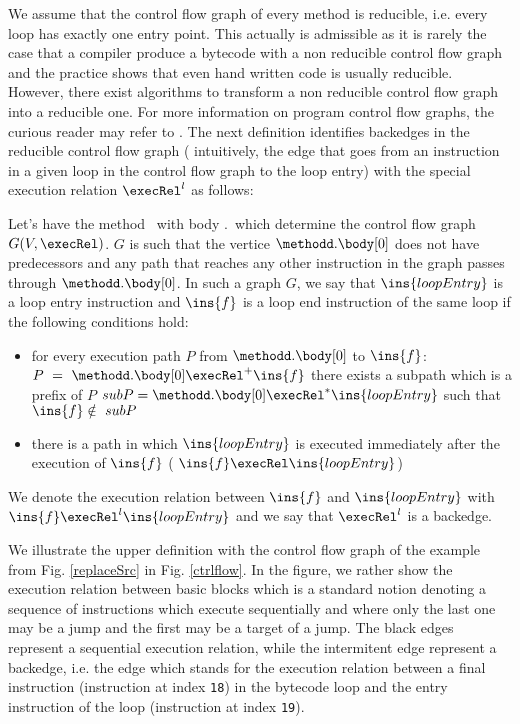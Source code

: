 We assume that the control flow graph of every method is reducible, i.e. every loop has exactly one entry point. This actually is admissible
as it is rarely the case that a compiler produce a bytecode with a non reducible control flow graph and the practice shows that even hand written
code is usually reducible. However, there exist algorithms to transform a non reducible control flow graph into a reducible one. 
For more information on program control flow graphs, the curious reader may refer to \cite{ARUCom1986}.
The next definition identifies backedges in the reducible control flow graph ( intuitively, the edge that goes 
from an instruction in a given loop in the control flow graph to the loop entry)  with the special execution relation $\execRel^l$ as follows:
 
\begin{defLoop}
\label{defLoop}
Let's have the method \methodd \ with body \methodd.\body \ which determine the control flow graph $G(V, \execRel) $.  $G$ is such that 
the vertice  $\methodd.\body[0]$ does not have predecessors and any path that reaches any other instruction in the graph
passes through $\methodd.\body[0]$. In such a graph $G$, we say that $\ins{loopEntry}$ is a loop entry instruction and $\ins{f}$ is a loop end instruction
 of the same loop if the following conditions hold:
\begin{itemize}
\item for every execution path $P$ from $\methodd.\body[0]$ to  $\ins{f}$:   $P~=~\methodd.\body[0] \execRel^{+} \ins{f}$
 there exists a subpath which is a prefix of $P$  $subP = \methodd.\body[0] \execRel^{*} \ins{loopEntry}$ such that $\ins{f} \notin  \ subP  $
\item there is a path in which $\ins{loopEntry}$  is executed immediately after the execution of $\ins{f}$ ( $\ins{f} \execRel \ins{loopEntry}$)
\end{itemize}
We denote the execution relation between $\ins{f}$ and  $\ins{loopEntry}$ with \\
$\ins{f} \execRel^l \ins{loopEntry}$ and we say that $  \execRel^l $  is a backedge. 
\end{defLoop}
We illustrate the upper definition with the control flow graph of the example from Fig. \ref{replaceSrc} in Fig. \ref{ctrlflow}.
In the figure, we rather show the execution relation between basic blocks which is a standard notion denoting a sequence of instructions which execute sequentially
and  where only the last one may be a jump and the first may be a target of a jump. 
The black edges represent a sequential execution relation, while the intermitent edge represent a backedge, i.e. the edge which stands for the execution
relation between a final instruction (instruction at index \texttt{18}) in the bytecode loop and the entry instruction of the loop (instruction at index \texttt{19}).  

